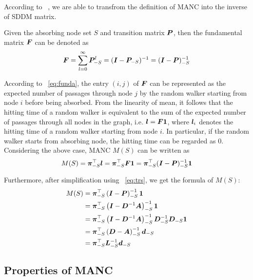 \documentclass[sigconf]{acmart}
\begin{document}
According to ~\cite{KeSn76}, we are able to transfrom the definition of MANC into the inverse of SDDM matrix.

\begin{fact}
    Given the absorbing node set \(S\) and transition matrix \(\boldsymbol{P}\), then the fundamental matrix \(\boldsymbol{F}\) can be denoted as
    \begin{equation}\label{eq:funda}
        \boldsymbol{F}=\sum_{l=0}^\infty\boldsymbol{P}_{-S}^l=(\boldsymbol{I}-\boldsymbol{P}_{-S})^{-1}=(\boldsymbol{I}-\boldsymbol{P})_{-S}^{-1}
    \end{equation}
\end{fact}

According to ~\eqref{eq:funda}, the entry \((i,j)\) of \(\boldsymbol{F}\) can be represented as the expected number of passages through node \(j\) by the random walker starting from node \(i\) before being absorbed.
From the linearity of mean, it follows that the hitting time of a random walker is equivalent to the sum of the expected number of passages through all nodes in the graph, i.e. \(\boldsymbol{l}=\boldsymbol{F}\boldsymbol{1}\), where \(\boldsymbol{l}_i\) denotes the hitting time of a random walker starting from node \(i\).
In particular, if the random walker starts from absorbing node, the hitting time can be regarded as \(0\). Considering the above case, MANC \(M(S)\) can be written as
\[M(S)=\boldsymbol{\pi}_{-S}^\top\boldsymbol{l}=\boldsymbol{\pi}_{-S}^\top\boldsymbol{F}\boldsymbol{1}=\boldsymbol{\pi}_{-S}^\top(\boldsymbol{I}-\boldsymbol{P})_{-S}^{-1}\boldsymbol{1}\]

Furthermore, after simplification using ~\eqref{eq:trs}, we get the formula of \(M(S)\):
\begin{equation}\label{eq:MANC}
    \begin{split}
        M(S) & =\boldsymbol{\pi}_{-S}^\top\left(\boldsymbol{I}-\boldsymbol{P}\right)_{-S}^{-1}\boldsymbol{1}                                    \\
        & =\boldsymbol{\pi}_{-S}^\top\left(\boldsymbol{I}-\boldsymbol{D}^{-1}\boldsymbol{A}\right)_{-S}^{-1}\boldsymbol{1}                          \\
        & =\boldsymbol{\pi}_{-S}^\top\left(\boldsymbol{I}-\boldsymbol{D}^{-1}\boldsymbol{A}\right)_{-S}^{-1}\boldsymbol{D}_{-S}^{-1}\boldsymbol{D}_{-S}\boldsymbol{1} \\
        & =\boldsymbol{\pi}_{-S}^\top\left(\boldsymbol{D}-\boldsymbol{A}\right)_{-S}^{-1}\boldsymbol{d}_{-S}                                \\
        & =\boldsymbol{\pi}_{-S}^\top\boldsymbol{L}_{-S}^{-1}\boldsymbol{d}_{-S}
    \end{split}
\end{equation}

\subsection{Properties of MANC}
\end{document}
